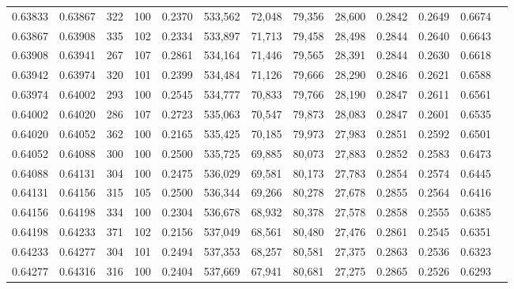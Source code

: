 \begin{tabular}{rrrrrrrrrrrrr}
0.63833 & 0.63867 &   322 & 100 &                                     0.2370 & 533,562 &  72,048 &  79,356 &  28,600 & 0.2842 & 0.2649 & 0.6674 \\
0.63867 & 0.63908 &   335 & 102 &                                     0.2334 & 533,897 &  71,713 &  79,458 &  28,498 & 0.2844 & 0.2640 & 0.6643 \\
0.63908 & 0.63941 &   267 & 107 &                                     0.2861 & 534,164 &  71,446 &  79,565 &  28,391 & 0.2844 & 0.2630 & 0.6618 \\
0.63942 & 0.63974 &   320 & 101 &                                     0.2399 & 534,484 &  71,126 &  79,666 &  28,290 & 0.2846 & 0.2621 & 0.6588 \\
0.63974 & 0.64002 &   293 & 100 &                                     0.2545 & 534,777 &  70,833 &  79,766 &  28,190 & 0.2847 & 0.2611 & 0.6561 \\
0.64002 & 0.64020 &   286 & 107 &                                     0.2723 & 535,063 &  70,547 &  79,873 &  28,083 & 0.2847 & 0.2601 & 0.6535 \\
0.64020 & 0.64052 &   362 & 100 &                                     0.2165 & 535,425 &  70,185 &  79,973 &  27,983 & 0.2851 & 0.2592 & 0.6501 \\
0.64052 & 0.64088 &   300 & 100 &                                     0.2500 & 535,725 &  69,885 &  80,073 &  27,883 & 0.2852 & 0.2583 & 0.6473 \\
0.64088 & 0.64131 &   304 & 100 &                                     0.2475 & 536,029 &  69,581 &  80,173 &  27,783 & 0.2854 & 0.2574 & 0.6445 \\
0.64131 & 0.64156 &   315 & 105 &                                     0.2500 & 536,344 &  69,266 &  80,278 &  27,678 & 0.2855 & 0.2564 & 0.6416 \\
0.64156 & 0.64198 &   334 & 100 &                                     0.2304 & 536,678 &  68,932 &  80,378 &  27,578 & 0.2858 & 0.2555 & 0.6385 \\
0.64198 & 0.64233 &   371 & 102 &                                     0.2156 & 537,049 &  68,561 &  80,480 &  27,476 & 0.2861 & 0.2545 & 0.6351 \\
0.64233 & 0.64277 &   304 & 101 &                                     0.2494 & 537,353 &  68,257 &  80,581 &  27,375 & 0.2863 & 0.2536 & 0.6323 \\
0.64277 & 0.64316 &   316 & 100 &                                     0.2404 & 537,669 &  67,941 &  80,681 &  27,275 & 0.2865 & 0.2526 & 0.6293 \\

\end{tabular}
